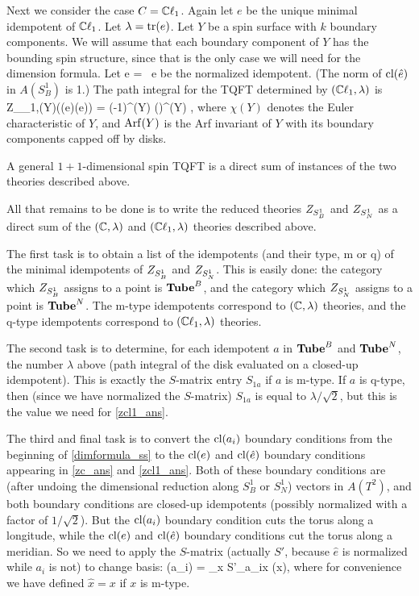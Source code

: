 Next we consider the case $C = \mathbb{C}\ell_1$.
Again let $e$ be the unique minimal idempotent of $\mathbb{C}\ell_1$.
Let $\lambda = \text{tr}(e)$.
Let $Y$ be a spin surface with $k$ boundary components.
We will assume that each boundary component of $Y$ has the bounding spin structure, since that is the only case
we will need for the dimension formula.
Let
\be
	\hat e =  \, e
\ee
be the normalized idempotent.
(The norm of $\text{cl}(\hat e)$ in $A(S^1_B)$ is 1.)
The path integral for the TQFT determined by $(\mathbb{C}\ell_1, \lambda)$ is
\be \label{zcl1_ans}
	Z_{\cliff_1,\lambda}(Y)(\cl(\hat e)\du\cdots\du \cl(\hat e)) = (-1)^{\Arf(Y)} \left(\right)^{\chi(Y)} ,
\ee
where $\chi(Y)$ denotes the Euler characteristic of $Y$,
and $\operatorname{Arf}(Y)$ is the Arf invariant of $Y$ with its boundary components capped off by disks.

A general $1{+}1$-dimensional spin TQFT is a direct sum of instances of the two theories described above.

\medskip

All that remains to be done is to write the reduced theories $Z_{S^1_B}$ and $Z_{S^1_N}$ as a direct sum of the $(\mathbb{C}, \lambda)$ and
$(\mathbb{C}\ell_1, \lambda)$ theories described above.

The first task is to obtain a list of the idempotents (and their type, m or q) of the minimal
idempotents of $Z_{S^1_B}$ and $Z_{S^1_N}$.
This is easily done: the category which $Z_{S^1_B}$ assigns to a point is $\textbf{Tube}^B$, and the 
category which $Z_{S^1_N}$ assigns to a point is $\textbf{Tube}^N$.
The m-type idempotents correspond to $(\mathbb{C},\lambda)$ theories, and the q-type idempotents
correspond to $(\mathbb{C}\ell_1,\lambda)$ theories.

The second task is to determine, for each idempotent $a$ in $\textbf{Tube}^B$ and $\textbf{Tube}^N$,
the number $\lambda$ above (path integral of the disk evaluated on a closed-up idempotent).
This is exactly the $S$-matrix entry $S_{1a}$ if $a$ is m-type.
If $a$ is q-type, then (since we have normalized the $S$-matrix) $S_{1a}$ is equal to $\lambda/\sqrt 2$, but this
is the value we need for \eqref{zcl1_ans}.

The third and final task is to convert the $\text{cl}(a_i)$ boundary conditions from the beginning of \ref{dimformula_ss}
to the $\text{cl}(e)$ and $\text{cl}(\hat e)$ boundary conditions appearing in \eqref{zc_ans} and \eqref{zcl1_ans}.
Both of these boundary conditions are (after undoing the dimensional reduction along $S^1_B$ or $S^1_N$) vectors
in $A(T^2)$, and both boundary conditions are closed-up idempotents (possibly normalized with a factor of $1/\sqrt 2$).
But the $\text{cl}(a_i)$ boundary condition cuts the torus along a longitude, while the $\text{cl}(e)$ and $\text{cl}(\hat e)$ boundary conditions
cut the torus along a meridian.
So we need to apply the $S$-matrix (actually $S'$, because $\hat e$ is normalized while $a_i$ is not) to change basis:
\be  \label{df_cob}
	\cl(a_i) = \sum_x S'_{a_ix} \cl(\hat x),
\ee
where for convenience we have defined $\hat x = x$ if $x$ is m-type.

